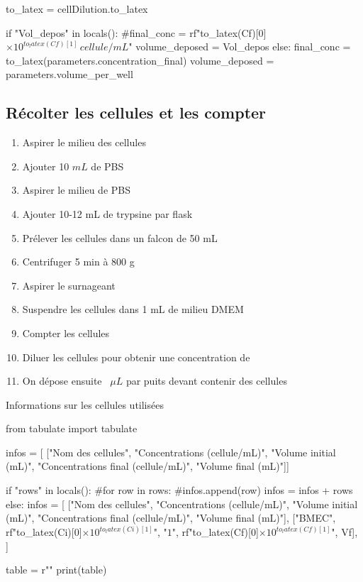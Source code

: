 \begin{pycode}

to_latex = cellDilution.to_latex

if "Vol_depos" in locals():
    #final_conc = rf"{to_latex(Cf)[0]}$\times 10^{to_latex(Cf)[1]}\, cellule/mL$"
    volume_deposed = Vol_depos
else:
    final_conc = to_latex(parameters.concentration_final)
    volume_deposed = parameters.volume_per_well
\end{pycode}

\subsection{Récolter les cellules et les compter}

\begin{enumerate}
\item Aspirer le milieu des cellules
\item Ajouter 10 $mL$ de PBS
\item Aspirer le milieu de PBS
\item Ajouter 10-12 mL de trypsine par flask
\item Prélever les cellules dans un falcon de 50 mL
\item Centrifuger 5 min à 800 g
\item Aspirer le surnageant 
\item Suspendre les cellules dans 1 mL de milieu DMEM
\item Compter les cellules
\item Diluer les cellules pour obtenir une concentration de 
\item On dépose ensuite ~$\mu L$ par puits devant contenir des cellules
\end{enumerate}

\begin{table}[h]
\caption{Informations sur les cellules utilisées}
\begin{pycode}

from tabulate import tabulate

infos = [
    ["Nom des cellules", "Concentrations (cellule/mL)", "Volume initial (mL)", "Concentrations final (cellule/mL)", "Volume final (mL)"]]
    
if "rows" in locals():
    #for row in rows:
        #infos.append(row)
    infos = infos + rows
else:   
    infos = [
    ["Nom des cellules", "Concentrations (cellule/mL)", "Volume initial (mL)", "Concentrations final (cellule/mL)", "Volume final (mL)"],
    ["BMEC", rf"{to_latex(Ci)[0]}$\times 10^{to_latex(Ci)[1]}$", "$1$", rf"{to_latex(Cf)[0]}$\times 10^{to_latex(Cf)[1]}$", Vf],
]

table = r""
print(table)
\end{pycode}
\label{table-comptage-cellules}
\end{table}